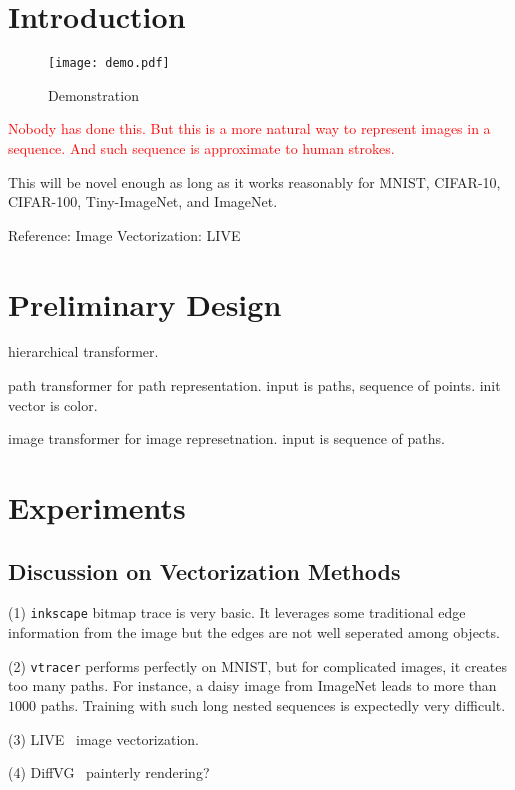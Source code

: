 \documentclass[10pt,twocolumn,letterpaper]{article}
\begin{document}
\section{Introduction}
\label{sec:intro}

\begin{figure}[t]
    \texttt{[image: demo.pdf]}
    \caption{Demonstration}
\end{figure}

\textcolor{red}{Nobody has done this. But this is a more natural way to represent images in a sequence. 
And such sequence is approximate to human strokes.}

This will be novel enough as long as it works reasonably for MNIST, CIFAR-10,
CIFAR-100, Tiny-ImageNet, and ImageNet.

Reference: Image Vectorization: LIVE \cite{live,dvg}

\section{Preliminary Design}

hierarchical transformer.

path transformer for path representation. input is paths, sequence of points. init vector is color.

image transformer for image represetnation. input is sequence of paths.

\section{Experiments}

\subsection{Discussion on Vectorization Methods}

(1) \verb|inkscape| bitmap trace is very basic. It leverages some traditional
edge information from the image but the edges are not well seperated among
objects.

(2) \verb|vtracer| performs perfectly on MNIST, but for complicated images, it
creates too many paths. For instance, a daisy image from ImageNet leads to more
than $1000$ paths.  Training with such long nested sequences is expectedly very
difficult.

(3) LIVE~\cite{live} image vectorization.

(4) DiffVG~\cite{dvg} painterly rendering?
\end{document}
